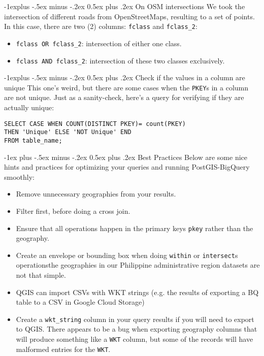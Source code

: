 \documentclass[10pt,landscape]{article}
\makeatletter
\renewcommand{\section}{\@startsection{section}{1}{0mm}%
                                {-1ex plus -.5ex minus -.2ex}%
                                {0.5ex plus .2ex}%
                                {\normalfont\large\bfseries}}
\renewcommand{\subsection}{\@startsection{subsection}{2}{0mm}%
                                {-1explus -.5ex minus -.2ex}%
                                {0.5ex plus .2ex}%
                                {\normalfont\normalsize\bfseries}}
\makeatother
\begin{document}
\begin{multicols}{3}
\subsection{On OSM intersections} We took the intersection of
different roads from OpenStreetMaps, resulting to a set of points. In this
case, there are two (2) columns: \texttt{fclass} and \texttt{fclass\_2}:

\begin{itemize}
    \item \texttt{fclass OR fclass\_2}: intersection of either one class. 
    \item \texttt{fclass AND fclass\_2}: intersection of these two classes
        exclusively.
\end{itemize}

\subsection{Check if the values in a column are unique} This one's weird, but
there are some cases when the \texttt{PKEY}s in a column are not unique. Just
as a sanity-check, here's a query for verifying if they are actually unique:

\begin{lstlisting}
SELECT CASE WHEN COUNT(DISTINCT PKEY)= count(PKEY)
THEN 'Unique' ELSE 'NOT Unique' END
FROM table_name;
\end{lstlisting}


\section{Best Practices}
Below are some nice hints and practices for optimizing your queries and running
PostGIS-BigQuery smoothly:

\begin{itemize}
    \item Remove unnecessary geographies from your results.
    \item Filter first, before doing a cross join.
    \item Ensure that all operations happen in the primary keys \texttt{pkey}
        rather than the geography.
    \item Create an envelope or bounding box when doing \texttt{within} or
        \texttt{intersect}s operations\textemdash the geographies in our
        Philippine administrative region datasets are not that simple. 
    \item QGIS can import CSVs with WKT strings (e.g. the results of exporting
        a BQ table to a CSV in Google Cloud Storage)
    \item Create a \texttt{wkt\_string} column in your query results if you
        will need to export to QGIS. There appears to be a bug when exporting
        geography columns that will produce something like a \texttt{WKT}
        column, but some of the records will have malformed entries for the
        \texttt{WKT}. 
\end{itemize}



\end{multicols}
\end{document}
